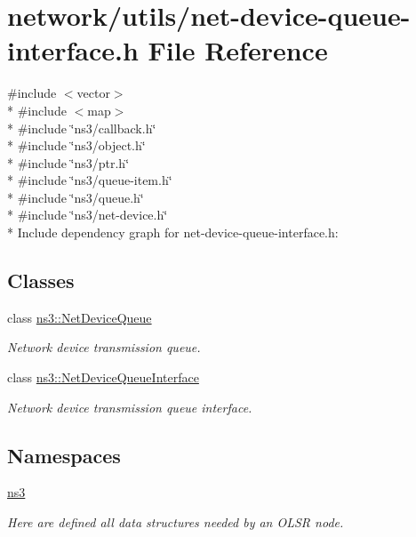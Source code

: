 \hypertarget{net-device-queue-interface_8h}{}\section{network/utils/net-\/device-\/queue-\/interface.h File Reference}
\label{net-device-queue-interface_8h}
{\ttfamily \#include $<$vector$>$}\\*
{\ttfamily \#include $<$map$>$}\\*
{\ttfamily \#include \char`\"{}ns3/callback.\+h\char`\"{}}\\*
{\ttfamily \#include \char`\"{}ns3/object.\+h\char`\"{}}\\*
{\ttfamily \#include \char`\"{}ns3/ptr.\+h\char`\"{}}\\*
{\ttfamily \#include \char`\"{}ns3/queue-\/item.\+h\char`\"{}}\\*
{\ttfamily \#include \char`\"{}ns3/queue.\+h\char`\"{}}\\*
{\ttfamily \#include \char`\"{}ns3/net-\/device.\+h\char`\"{}}\\*
Include dependency graph for net-\/device-\/queue-\/interface.h\+:
\subsection*{Classes}
\begin{DoxyCompactItemize}
\item 
class \hyperlink{classns3_1_1NetDeviceQueue}{ns3\+::\+Net\+Device\+Queue}
\begin{DoxyCompactList}\small\item\em Network device transmission queue. \end{DoxyCompactList}\item 
class \hyperlink{classns3_1_1NetDeviceQueueInterface}{ns3\+::\+Net\+Device\+Queue\+Interface}
\begin{DoxyCompactList}\small\item\em Network device transmission queue interface. \end{DoxyCompactList}\end{DoxyCompactItemize}
\subsection*{Namespaces}
\begin{DoxyCompactItemize}
\item 
 \hyperlink{namespacens3}{ns3}
\begin{DoxyCompactList}\small\item\em Here are defined all data structures needed by an O\+L\+SR node. \end{DoxyCompactList}\end{DoxyCompactItemize}
